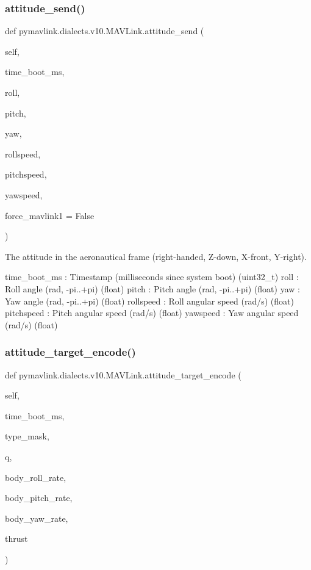 \subsubsection{\texorpdfstring{attitude\+\_\+send()}{attitude\_send()}}
{\footnotesize\ttfamily def pymavlink.\+dialects.\+v10.\+M\+A\+V\+Link.\+attitude\+\_\+send (\begin{DoxyParamCaption}\item[{}]{self,  }\item[{}]{time\+\_\+boot\+\_\+ms,  }\item[{}]{roll,  }\item[{}]{pitch,  }\item[{}]{yaw,  }\item[{}]{rollspeed,  }\item[{}]{pitchspeed,  }\item[{}]{yawspeed,  }\item[{}]{force\+\_\+mavlink1 = {\ttfamily False} }\end{DoxyParamCaption})}

\begin{DoxyVerb}The attitude in the aeronautical frame (right-handed, Z-down, X-front,
Y-right).

time_boot_ms              : Timestamp (milliseconds since system boot) (uint32_t)
roll                      : Roll angle (rad, -pi..+pi) (float)
pitch                     : Pitch angle (rad, -pi..+pi) (float)
yaw                       : Yaw angle (rad, -pi..+pi) (float)
rollspeed                 : Roll angular speed (rad/s) (float)
pitchspeed                : Pitch angular speed (rad/s) (float)
yawspeed                  : Yaw angular speed (rad/s) (float)\end{DoxyVerb}
 \mbox{\label{classpymavlink_1_1dialects_1_1v10_1_1MAVLink_a1708bace57d5fa8cf33121e9db3321c8}} 
\subsubsection{\texorpdfstring{attitude\+\_\+target\+\_\+encode()}{attitude\_target\_encode()}}
{\footnotesize\ttfamily def pymavlink.\+dialects.\+v10.\+M\+A\+V\+Link.\+attitude\+\_\+target\+\_\+encode (\begin{DoxyParamCaption}\item[{}]{self,  }\item[{}]{time\+\_\+boot\+\_\+ms,  }\item[{}]{type\+\_\+mask,  }\item[{}]{q,  }\item[{}]{body\+\_\+roll\+\_\+rate,  }\item[{}]{body\+\_\+pitch\+\_\+rate,  }\item[{}]{body\+\_\+yaw\+\_\+rate,  }\item[{}]{thrust }\end{DoxyParamCaption})}


